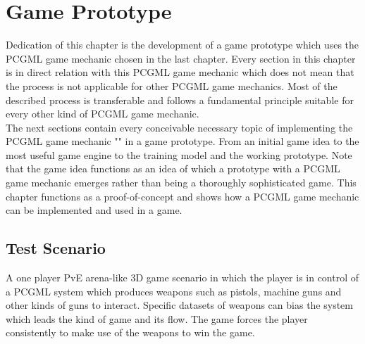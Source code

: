 \documentclass[MGS,Master,english]{twbook}%
\begin{document}
\chapter{Game Prototype} \label{chapter::gamePrototype}
Dedication of this chapter is the development of a game prototype which uses the PCGML game mechanic chosen in the last chapter. Every section in this chapter is in direct relation with this PCGML game mechanic which does not mean that the process is not applicable for other PCGML game mechanics. Most of the described process is transferable and follows a fundamental principle suitable for every other kind of PCGML game mechanic. \\
The next sections contain every conceivable necessary topic of implementing the PCGML game mechanic "" in a game prototype. From an initial game idea to the most useful game engine to the training model and the working prototype. Note that the game idea functions as an idea of which a prototype with a PCGML game mechanic emerges rather than being a thoroughly sophisticated game. This chapter functions as a proof-of-concept and shows how a PCGML game mechanic can be implemented and used in a game.

\section{Test Scenario}
A one player \ac{PvE} arena-like 3D game scenario in which the player is in control of a PCGML system which produces weapons such as pistols, machine guns and other kinds of guns to interact. Specific datasets of weapons can bias the system which leads the kind of game and its flow. The game forces the player consistently to make use of the weapons to win the game. 
\end{document}
